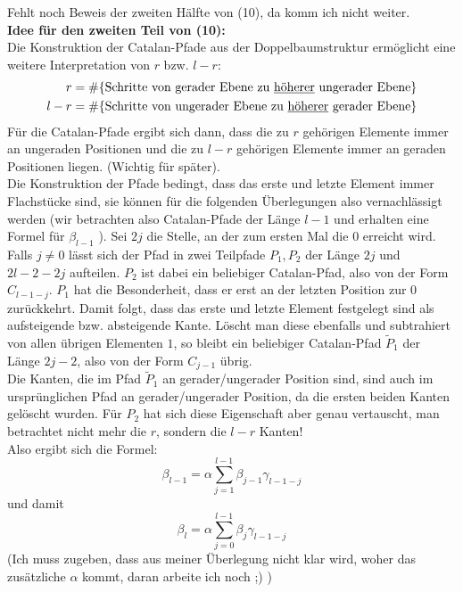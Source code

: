 \documentclass[a4paper, 11pt]{scrreprt}
\newenvironment{beweis}[1][Beweis]{\begin{trivlist}
	\item[\hskip \labelsep {\bfseries #1}]}
	{\end{trivlist}}
\begin{document}
\begin{beweis}
Fehlt noch Beweis der zweiten Hälfte von (10), da komm ich nicht weiter.\\
\textbf{Idee für den zweiten Teil von (10):}\\
Die Konstruktion der Catalan-Pfade aus der Doppelbaumstruktur ermöglicht eine weitere Interpretation von \(r\) bzw. \(l-r\):\\
\begin{align*}
	r&=\# \{\text{Schritte von gerader Ebene zu \underline{höherer} ungerader Ebene}\} \\
	l-r &= \#\{\text{Schritte von ungerader Ebene zu \underline{höherer} gerader Ebene}\}
\end{align*}
Für die Catalan-Pfade ergibt sich dann, dass die zu \(r\) gehörigen Elemente immer an ungeraden Positionen und die zu \(l-r\) gehörigen Elemente immer an geraden Positionen liegen. (Wichtig für später).\\
Die Konstruktion der Pfade bedingt, dass das erste und letzte Element immer Flachstücke sind, sie können für die folgenden Überlegungen also vernachlässigt werden (wir betrachten also Catalan-Pfade der Länge \(l-1\) und erhalten eine Formel für \(\beta_{l-1}\) ). Sei \(2j\) die Stelle, an der zum ersten Mal die \(0\) erreicht wird. Falls \(j\not=0\) lässt sich der Pfad in zwei Teilpfade \(P_1, P_2\) der Länge \(2j\) und \(2l-2-2j\) aufteilen. \(P_2\) ist dabei ein beliebiger Catalan-Pfad, also von der Form \(C_{l-1-j}\). \(P_1\) hat die Besonderheit, dass er erst an der letzten Position zur \(0\) zurückkehrt. Damit folgt, dass das erste und letzte Element festgelegt sind als aufsteigende bzw. absteigende Kante. Löscht man diese ebenfalls und subtrahiert von allen übrigen Elementen \(1\), so bleibt ein beliebiger Catalan-Pfad \(\tilde{P}_1\) der Länge \(2j-2\), also von der Form \(C_{j-1}\) übrig. \\
Die Kanten, die im Pfad \(\tilde{P}_1\) an gerader/ungerader Position sind, sind auch im ursprünglichen Pfad an gerader/ungerader Position, da die ersten beiden Kanten gelöscht wurden. Für \(P_2\) hat sich diese Eigenschaft aber genau vertauscht, man betrachtet nicht mehr die \(r\), sondern die \(l-r\) Kanten!\\
Also ergibt sich die Formel:
	\[\beta_{l-1}=\alpha \sum_{j=1}^{l-1}\beta_{j-1}\gamma_{l-1-j}\]
und damit
	\[\beta_l=\alpha \sum_{j=0}^{l-1}\beta_j\gamma_{l-1-j}\]
(Ich muss zugeben, dass aus meiner Überlegung nicht klar wird, woher das zusätzliche \(\alpha\) kommt, daran arbeite ich noch ;) )


\end{beweis}
\end{document}
